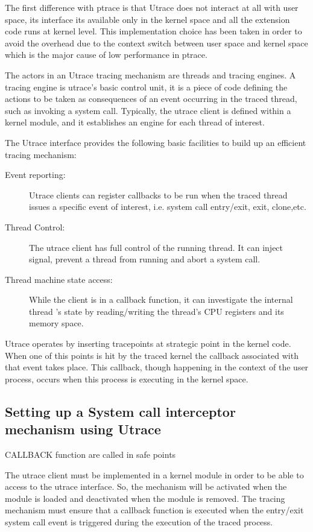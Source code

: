 The first difference with ptrace is that Utrace does not interact at all with user space, its interface its available only in the kernel space and all the extension code runs at kernel level. This implementation choice has been taken in order to avoid the overhead due to the context switch between user space and kernel space which is the major cause of low performance in ptrace.
 
The actors in an Utrace tracing mechanism are threads and tracing engines. A tracing engine is utrace's basic control unit, it is a piece of code defining the actions to be taken as consequences of an event occurring in the traced thread, such as invoking a system call. Typically, the utrace client is defined within a kernel module, and it establishes an engine for each thread of interest.

The Utrace interface provides the following basic facilities to build up an efficient tracing mechanism: 
\begin{description}
\item[Event reporting:]
		Utrace clients can register callbacks to be run when the traced thread issues a specific event of interest, i.e. system call entry/exit, exit, clone,etc.
\item[Thread Control:]
		The utrace client has full control of the running thread. It can inject signal, prevent a thread from running and abort a system call.   
\item[Thread machine state access:]
		While the client is  in a callback function, it can investigate the internal thread 's state by reading/writing the thread’s CPU registers and its memory space.	
\end{description}

Utrace operates by inserting tracepoints at strategic point in the kernel code. When one of this points is hit by the traced kernel the callback associated with that event takes place. This callback, though happening in the context of the user process,  occurs when this process is executing in the kernel space.  

\subsection{Setting up a System call interceptor mechanism using Utrace}
 
CALLBACK function are called in safe points

The utrace client must be implemented in a kernel module in order to be able to access to the utrace interface. So, the mechanism will be activated when the module is loaded and deactivated when the module is removed. The tracing mechanism must ensure that a callback function is executed when the entry/exit system call event is triggered during the execution of the traced process.

